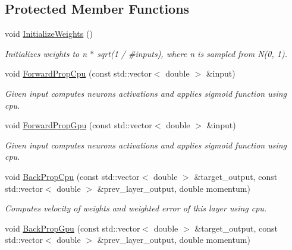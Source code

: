 \subsection*{Protected Member Functions}
\begin{DoxyCompactItemize}
\item 
\mbox{\label{classneuralnet_1_1SigmoidOutputLayer_addd25979249109859e9b4ac846b70100}} 
void \hyperlink{classneuralnet_1_1SigmoidOutputLayer_addd25979249109859e9b4ac846b70100}{Initialize\+Weights} ()
\begin{DoxyCompactList}\small\item\em Initializes weights to n $\ast$ sqrt(1 / \#inputs), where n is sampled from N(0, 1). \end{DoxyCompactList}\item 
void \hyperlink{classneuralnet_1_1SigmoidOutputLayer_a95e0f2dcabbb16bd24a59f19eaf0999f}{Forward\+Prop\+Cpu} (const std\+::vector$<$ double $>$ \&input)
\begin{DoxyCompactList}\small\item\em Given input computes neurons\textquotesingle{} activations and applies sigmoid function using cpu. \end{DoxyCompactList}\item 
void \hyperlink{classneuralnet_1_1SigmoidOutputLayer_aaaa8a49435e351e688699a3d27db5c9a}{Forward\+Prop\+Gpu} (const std\+::vector$<$ double $>$ \&input)
\begin{DoxyCompactList}\small\item\em Given input computes neurons\textquotesingle{} activations and applies sigmoid function using cpu. \end{DoxyCompactList}\item 
void \hyperlink{classneuralnet_1_1SigmoidOutputLayer_a8020ad060ff1c3349bbf67ec3f3fccb8}{Back\+Prop\+Cpu} (const std\+::vector$<$ double $>$ \&target\+\_\+output, const std\+::vector$<$ double $>$ \&prev\+\_\+layer\+\_\+output, double momentum)
\begin{DoxyCompactList}\small\item\em Computes velocity of weights and weighted error of this layer using cpu. \end{DoxyCompactList}\item 
void \hyperlink{classneuralnet_1_1SigmoidOutputLayer_a0e9397124e10c8be7a7f587982e7c948}{Back\+Prop\+Gpu} (const std\+::vector$<$ double $>$ \&target\+\_\+output, const std\+::vector$<$ double $>$ \&prev\+\_\+layer\+\_\+output, double momentum)

\end{DoxyCompactItemize}
